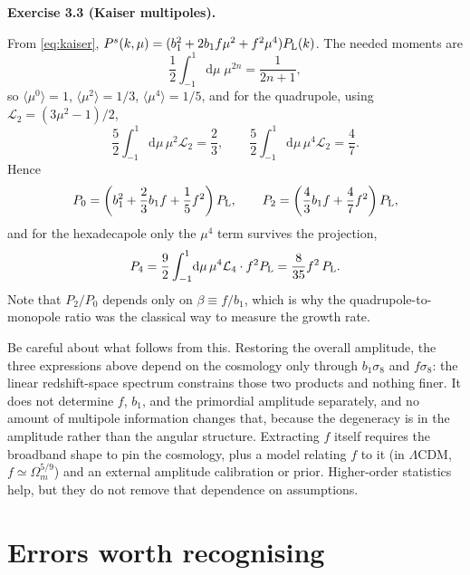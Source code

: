 \documentclass[a4paper,11pt]{article}
\def\Plin{P_{\rm L}}
\newcommand{\dd}{\mathrm{d}}
\def\Om{\Omega_m}
\def\lcdm{$\Lambda$CDM}
\newenvironment{solution}[1]
  {\par\medskip\noindent\textbf{#1}\par\nobreak\smallskip}
  {\par\medskip}
\begin{document}
\begin{solution}{Exercise 3.3 (Kaiser multipoles).}
From \eqref{eq:kaiser},
$P^s(k,\mu) = (b_1^2 + 2b_1f\mu^2 + f^2\mu^4)\Plin(k)$. The needed moments are
\begin{equation*}
\frac12\int_{-1}^{1}\!\dd\mu\;\mu^{2n}
= \frac{1}{2n+1} ,
\end{equation*}
so $\langle\mu^0\rangle = 1$, $\langle\mu^2\rangle = 1/3$,
$\langle\mu^4\rangle = 1/5$, and for the quadrupole, using
$\mathcal{L}_2 = (3\mu^2-1)/2$,
\begin{equation*}
\frac{5}{2}\int_{-1}^{1}\!\dd\mu\,\mu^2\mathcal{L}_2 = \frac{2}{3},
\qquad
\frac{5}{2}\int_{-1}^{1}\!\dd\mu\,\mu^4\mathcal{L}_2 = \frac{4}{7}.
\end{equation*}
Hence
\begin{equation*}
P_0 = \left(b_1^2 + \frac23 b_1f + \frac15 f^2\right)\Plin ,
\qquad
P_2 = \left(\frac43 b_1f + \frac47 f^2\right)\Plin ,
\end{equation*}
and for the hexadecapole only the $\mu^4$ term survives the projection,
\begin{equation*}
P_4 = \frac{9}{2}\int_{-1}^{1}\!\dd\mu\,\mu^4\mathcal{L}_4 \cdot f^2\Plin
= \frac{8}{35}f^2\,\Plin .
\end{equation*}
Note that $P_2/P_0$ depends only on $\beta \equiv f/b_1$, which is why the
quadrupole-to-monopole ratio was the classical way to measure the growth rate.

Be careful about what follows from this. Restoring the overall amplitude, the
three expressions above depend on the cosmology only through $b_1\sigma_8$ and
$f\sigma_8$: the linear redshift-space spectrum constrains those two products
and nothing finer. It does not determine $f$, $b_1$, and the primordial
amplitude separately, and no amount of multipole information changes that,
because the degeneracy is in the amplitude rather than the angular structure.
Extracting $f$ itself requires the broadband shape to pin the cosmology, plus a
model relating $f$ to it (in \lcdm, $f \simeq \Om^{5/9}$) and an external
amplitude calibration or prior. Higher-order statistics help, but they do not
remove that dependence on assumptions.
\end{solution}

\section*{Errors worth recognising}
\end{document}
